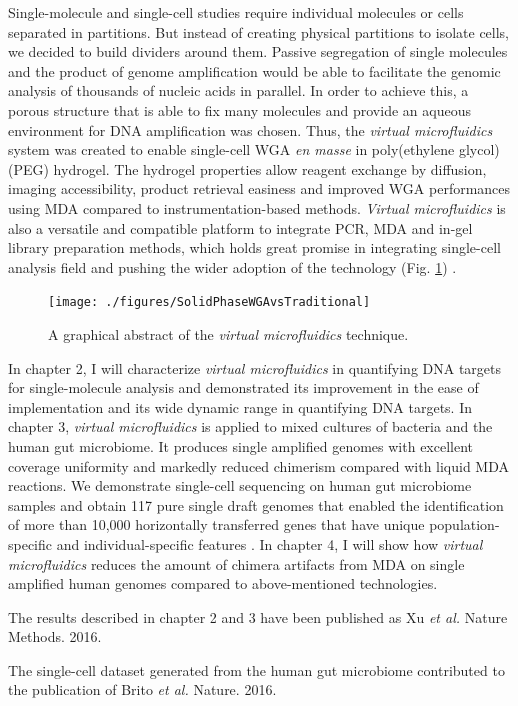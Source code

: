 Single-molecule and single-cell studies require individual molecules or cells separated in partitions. But instead of creating physical partitions to isolate cells, we decided to build  dividers around them. Passive segregation of single molecules and the product of genome amplification would be able to facilitate the genomic analysis of thousands of nucleic acids in parallel. In order to achieve this, a porous structure that is able to fix many molecules and provide an aqueous environment for DNA amplification was chosen. Thus, the \textit{virtual microfluidics} system was created to enable single-cell WGA \textit{en masse} in poly(ethylene glycol) (PEG) hydrogel. The hydrogel properties allow reagent exchange by diffusion, imaging accessibility, product retrieval easiness and improved WGA performances using MDA compared to instrumentation-based methods. \textit{Virtual microfluidics} is also a versatile and compatible platform to integrate PCR, MDA and in-gel library preparation methods, which holds great promise in integrating single-cell analysis field and pushing the wider adoption of the technology (Fig. \ref{fig:FigAbstract}) . 

\begin{figure}[ht!]
\centering
\texttt{[image: ./figures/SolidPhaseWGAvsTraditional]}
\caption[A graphical abstract of the \textit{virtual microfluidics} technique]{A graphical abstract of the \textit{virtual microfluidics} technique.}
\label{fig:FigAbstract}
\end{figure}

In chapter 2, I will characterize \textit{virtual microfluidics} in quantifying DNA targets for single-molecule analysis and demonstrated its improvement in the ease of implementation and its wide dynamic range in quantifying DNA targets. In chapter 3, \textit{virtual microfluidics} is applied to mixed cultures of bacteria and the human gut microbiome. It produces single amplified genomes with excellent coverage uniformity and markedly reduced chimerism compared with liquid MDA reactions. We demonstrate single-cell sequencing on human gut microbiome samples and obtain 117 pure single draft genomes that enabled the identification of more than 10,000 horizontally transferred genes that have unique population-specific and individual-specific features \cite{Brito:2016cd}. In chapter 4, I will show how \textit{virtual microfluidics} reduces the amount of chimera artifacts from MDA on single amplified human genomes compared to above-mentioned technologies. 
 
The results described in chapter 2 and 3 have been published as Xu \textit{et al.} Nature Methods. 2016.

The single-cell dataset generated from the human gut microbiome contributed to the publication of Brito \textit{et al.} Nature. 2016.

